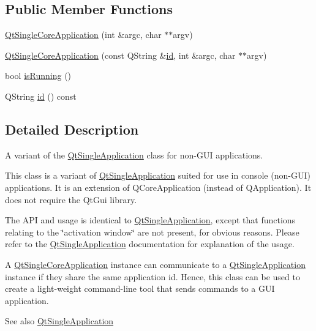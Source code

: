 \subsection*{Public Member Functions}
\begin{DoxyCompactItemize}
\item 
\hyperlink{class_qt_single_core_application_a1329cb65a5706c21257f191b9d8b6548}{Qt\+Single\+Core\+Application} (int \&argc, char $\ast$$\ast$argv)
\item 
\hyperlink{class_qt_single_core_application_a2c5792a0addef95dd78b37ab55a985a7}{Qt\+Single\+Core\+Application} (const Q\+String \&\hyperlink{class_qt_single_core_application_aad587c2d4536fd153672af7ee0389478}{id}, int \&argc, char $\ast$$\ast$argv)
\item 
bool \hyperlink{class_qt_single_core_application_a419bfb7b02f0459f4d207d448bc6c876}{is\+Running} ()
\item 
Q\+String \hyperlink{class_qt_single_core_application_aad587c2d4536fd153672af7ee0389478}{id} () const 
\end{DoxyCompactItemize}


\subsection{Detailed Description}
A variant of the \hyperlink{class_qt_single_application}{Qt\+Single\+Application} class for non-\/\+G\+UI applications. 

This class is a variant of \hyperlink{class_qt_single_application}{Qt\+Single\+Application} suited for use in console (non-\/\+G\+UI) applications. It is an extension of Q\+Core\+Application (instead of Q\+Application). It does not require the Qt\+Gui library.

The A\+PI and usage is identical to \hyperlink{class_qt_single_application}{Qt\+Single\+Application}, except that functions relating to the \char`\"{}activation window\char`\"{} are not present, for obvious reasons. Please refer to the \hyperlink{class_qt_single_application}{Qt\+Single\+Application} documentation for explanation of the usage.

A \hyperlink{class_qt_single_core_application}{Qt\+Single\+Core\+Application} instance can communicate to a \hyperlink{class_qt_single_application}{Qt\+Single\+Application} instance if they share the same application id. Hence, this class can be used to create a light-\/weight command-\/line tool that sends commands to a G\+UI application.

\begin{DoxySeeAlso}{See also}
\hyperlink{class_qt_single_application}{Qt\+Single\+Application} 
\end{DoxySeeAlso}



